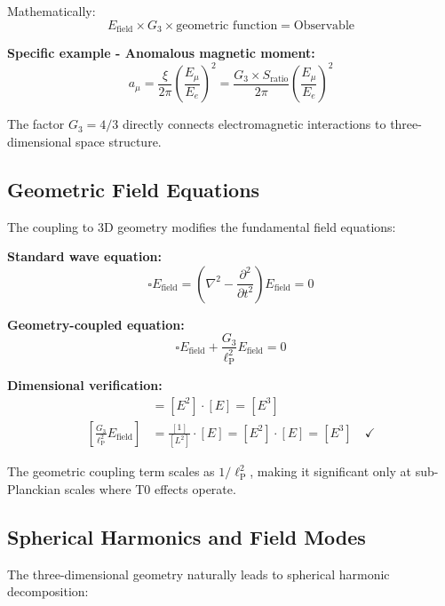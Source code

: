 \documentclass[12pt,a4paper]{report}
\newcommand{\lP}{\ell_{\text{P}}}         %
\begin{document}
	Mathematically:
	\begin{equation}
		E_{\text{field}} \times G_3 \times \text{geometric function} = \text{Observable}
	\end{equation}
	
	\textbf{Specific example - Anomalous magnetic moment:}
	\begin{equation}
		a_\mu = \frac{\xi}{2\pi} \left(\frac{E_\mu}{E_e}\right)^2 = \frac{G_3 \times S_{\text{ratio}}}{2\pi} \left(\frac{E_\mu}{E_e}\right)^2
	\end{equation}
	
	The factor $G_3 = 4/3$ directly connects electromagnetic interactions to three-dimensional space structure.
	
	\subsection{Geometric Field Equations}
	\label{subsec:geometric_field_equations}
	
	The coupling to 3D geometry modifies the fundamental field equations:
	
	\textbf{Standard wave equation:}
	\begin{equation}
		\square E_{\text{field}} = \left(\nabla^2 - \frac{\partial^2}{\partial t^2}\right) E_{\text{field}} = 0
	\end{equation}
	
	\textbf{Geometry-coupled equation:}
	\begin{equation}
		\square E_{\text{field}} + \frac{G_3}{\lP^2} E_{\text{field}} = 0
	\end{equation}
	
	\textbf{Dimensional verification:}
	\begin{align}
		[\square E_{\text{field}}] &= [E^2] \cdot [E] = [E^3] \\
		\left[\frac{G_3}{\lP^2} E_{\text{field}}\right] &= \frac{[1]}{[L^2]} \cdot [E] = [E^2] \cdot [E] = [E^3] \quad \checkmark
	\end{align}
	
	The geometric coupling term scales as $1/\lP^2$, making it significant only at sub-Planckian scales where T0 effects operate.
	
	\subsection{Spherical Harmonics and Field Modes}
	\label{subsec:spherical_harmonics}
	
	The three-dimensional geometry naturally leads to spherical harmonic decomposition:
	
\end{document}
